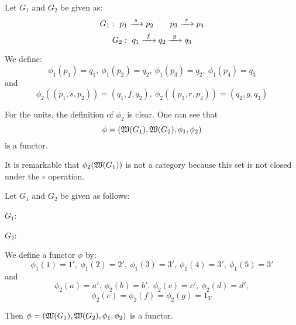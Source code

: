 \bigskip
\begin{example}
Let $G_1$ and $G_2$ be given as:
\[ G_1:\ p_1 \xrightarrow{\ {s}\ } p_2 \qquad p_3 \xrightarrow{\ {r}\ } p_4 \]
\[ G_2:\ q_1 \xrightarrow{\ {f}\ } q_2 \xrightarrow{\ {g}\ } q_3 \]

We define:
\[ \phi_1(p_1) = q_1,\ \phi_1(p_2) = q_2,\ \phi_1(p_3) =
q_2,\ \phi_1(p_4) = q_3 \]
and
\[ \phi_2((p_1, s, p_2)) = (q_1, f, q_2),\ \phi_2((p_3, r, p_4)) = (q_2, g,
q_3)\]

For the units, the definition of $\phi_2$ is clear. One can see that 
\[ \phi = (\mbox{$\mathfrak{W}({G_1})$}, \mbox{$\mathfrak{W}({G_2})$}, \phi_1, \phi_2) \]
is a functor.

It is remarkable that $\phi_2(\mbox{$\mathfrak{W}({G_1})$})$ is not a category because this
set is not closed under the $\circ$ operation.
\end{example}

\bigskip
\begin{example}
Let $G_1$ and $G_2$ be given as follows:

$G_1$:
\begin{center}

\end{center}

$G_2$:
\begin{center}

\end{center}

We define a functor $\phi$ by:
\[ \phi_1(1) = 1',\ \phi_1(2) = 2',\ \phi_1(3) = 3',\ \phi_1(4) = 3',\ \phi_1(5)
= 3' \]
and
\[ \phi_2(a) = a',\ \phi_2(b) = b',\ \phi_2(c) = c',\ \phi_2(d) = d',\]
\[ \phi_2(e) = \phi_2(f) = \phi_2(g) = 1_{3'} \]

Then $\phi = (\mbox{$\mathfrak{W}({G_1})$}, \mbox{$\mathfrak{W}({G_2})$}, \phi_1, \phi_2)$ is a functor.
\end{example}

